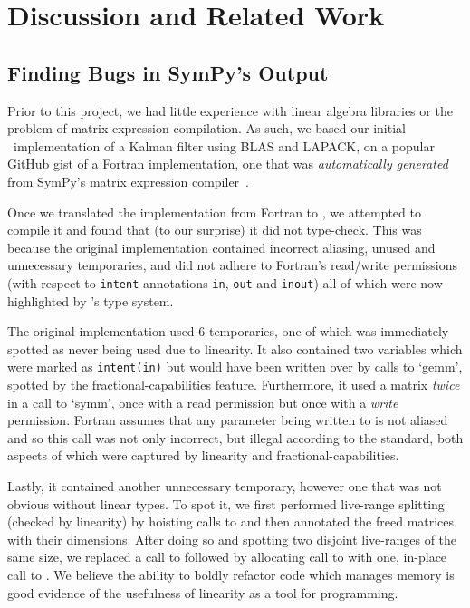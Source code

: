 \section{Discussion and Related Work}\label{sec:discussion_related_work}

\subsection{Finding Bugs in SymPy's Output}

Prior to this project, we had little experience with linear algebra libraries
or the problem of matrix expression compilation. As such, we based our initial
\lang\ implementation of a Kalman filter using BLAS and LAPACK, on a popular
GitHub gist of a Fortran implementation, one that was \emph{automatically
generated} from SymPy's matrix expression compiler~\cite{rocklin_thesis}.

Once we translated the implementation from Fortran to \lang, we attempted to
compile it and found that (to our surprise) it did not type-check. This was
because the original implementation contained incorrect aliasing, unused and
unnecessary temporaries, and did not adhere to Fortran's read/write permissions
(with respect to \texttt{intent} annotations \texttt{in}, \texttt{out} and
\texttt{inout}) all of which were now highlighted by \lang's type system.

The original implementation used 6 temporaries, one of which was immediately
spotted as never being used due to linearity. It also contained two variables
which were marked as \texttt{intent(in)} but would have been written over by
calls to `gemm', spotted by the fractional-capabilities feature. Furthermore,
it used a matrix \emph{twice} in a call to `symm', once with a read permission
but once with a \emph{write} permission.  Fortran assumes that any parameter
being written to is not aliased and so this call was not only incorrect, but
illegal according to the standard, both aspects of which were captured by
linearity and fractional-capabilities.

Lastly, it contained another unnecessary temporary, however one that was not
obvious without linear types. To spot it, we first performed live-range
splitting (checked by linearity) by hoisting calls to  and then
annotated the freed matrices with their dimensions.  After doing so and
spotting two disjoint live-ranges of the same size, we replaced a call to
 followed by allocating call to  with one, in-place
call to . We believe the ability to boldly refactor code which
manages memory is good evidence of the usefulness of linearity as a tool for
programming.

